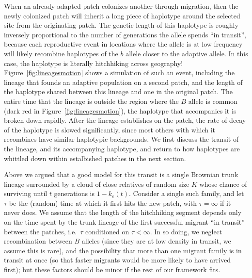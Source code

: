 \documentclass{article}
\begin{document}
When an already adapted patch colonizes another through migration,
then the newly colonized patch will inherit a long piece of haplotype around the selected site from the originating patch.
The genetic length of this haplotype is roughly inversely proportional to the
number of generations the allele spends ``in transit'', 
because each reproductive event in locations where the allele is at
low frequency will likely recombine haplotypes of the $b$ allele closer to the adaptive allele. 
In this case, the haplotype is literally hitchhiking across geography!
Figure~\ref{fig:lineagesmotion} shows a simulation of such an event,
including the lineage that founds an adaptive population on a second patch,
and the length of the haplotype shared between this lineage and one in the original patch.
The entire time that the lineage is outside the region where the $B$ allele is common (dark red in Figure~\ref{fig:lineagesmotion}), 
the haplotype that accompanies it is broken down rapidly. 
After the lineage establishes on the patch, the rate of decay of the haplotype is slowed significantly, 
since most others with which it recombines have similar haplotypic backgrounds. 
We first discuss the transit of the lineage, and its accompanying haplotype, and return
to how haplotypes are whittled down within estalbished patches in the next section.


Above we argued that a good model for this transit is a single Brownian trunk lineage
surrounded by a cloud of close relatives of random size $K$
whose chance of surviving until $t$ generations is $1-k_e(t)$.
Consider a single such family, and let $\tau$ be the (random) time at which it first hits the new patch,
with $\tau = \infty$ if it never does. 
We assume that the length of the hitchhiking segment depends only on 
the time spent by the trunk lineage of the first successful migrant ``in transit'' between the patches,
i.e.\ $\tau$ conditioned on $\tau < \infty$.
In so doing, we neglect 
recombination between $B$ alleles (since they are at low density in transit, we assume this is rare),
and the possibility that more than one migrant family is in transit at once
(so that faster migrants would be more likely to have arrived first);
but these factors should be minor if the rest of our framework fits.
\end{document}
